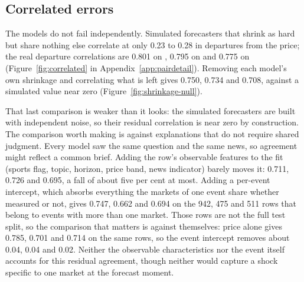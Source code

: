 \begin{table}[!tbp]
\centering
\caption{Leaning with or against the crowd. Rows where the market sits at exactly 0.5, or the
model exactly at the price, have no direction and are in neither group, so shares do not sum
to 100\%; they still count in the net deficit quoted in the text, which is why shares
recomputed from this table alone differ slightly on \winA. Brier edge is the market's score
minus the model's. All models pooled, test split of the primary set; brackets are 95\%
event-resampling ranges. Return averages each trade's own return after fees, so it is not
win share over price paid.}
\label{tab:crowd}

\end{table}

\subsection{Correlated errors}
\label{sec:results-correlated}

The models do not fail independently. Simulated forecasters that shrink as hard
but share nothing else correlate at only 0.23 to 0.28 in departures from the
price; the real departure correlations are 0.801 on \winA, 0.795 on \winB and
0.775 on \winC (Figure~\ref{fig:correlated} in Appendix~\ref{app:pairdetail}).
Removing each model's own shrinkage and correlating what is left gives 0.750,
0.734 and 0.708, against a simulated value near zero
(Figure~\ref{fig:shrinkage-null}).

That last comparison is weaker than it looks: the simulated forecasters are built
with independent noise, so their residual correlation is near zero by
construction. The comparison worth making is against explanations that do not
require shared judgment. Every model saw the same question and the same news, so
agreement might reflect a common brief. Adding the row's observable features to
the fit (sports flag, topic, horizon, price band, news indicator) barely moves it:
0.711, 0.726 and 0.695, a fall of about five per cent at most. Adding a per-event
intercept, which absorbs everything the markets of one event share whether
measured or not, gives 0.747, 0.662 and 0.694 on the 942, 475 and 511 rows that
belong to events with more than one market. Those rows are not the full test
split, so the comparison that matters is against themselves: price alone gives
0.785, 0.701 and 0.714 on the same rows, so the event intercept removes about
0.04, 0.04 and 0.02. Neither the observable characteristics nor the event itself
accounts for this residual agreement, though neither would capture a shock
specific to one market
at the forecast moment.

